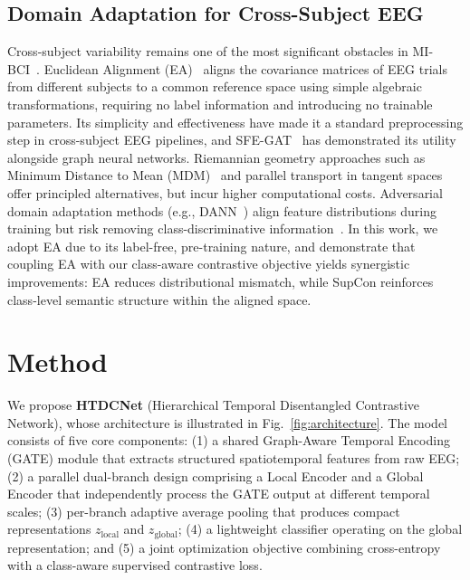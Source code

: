 \documentclass[conference]{IEEEtran}
\begin{document}
\subsection{Domain Adaptation for Cross-Subject EEG}
Cross-subject variability remains one of the most significant obstacles in MI-BCI~\cite{lotte2018review}.
Euclidean Alignment (EA)~\cite{he2019transfer} aligns the covariance matrices of EEG trials from different subjects to a common reference space using simple algebraic transformations, requiring no label information and introducing no trainable parameters.
Its simplicity and effectiveness have made it a standard preprocessing step in cross-subject EEG pipelines, and SFE-GAT~\cite{tang2024sfe} has demonstrated its utility alongside graph neural networks.
Riemannian geometry approaches such as Minimum Distance to Mean (MDM)~\cite{barachant2012multiclass} and parallel transport in tangent spaces offer principled alternatives, but incur higher computational costs.
Adversarial domain adaptation methods (e.g., DANN~\cite{ganin2016domain}) align feature distributions during training but risk removing class-discriminative information~\cite{ozdenizci2020adversarial}.
In this work, we adopt EA due to its label-free, pre-training nature, and demonstrate that coupling EA with our class-aware contrastive objective yields synergistic improvements: EA reduces distributional mismatch, while SupCon reinforces class-level semantic structure within the aligned space.

\section{Method}
\label{sec:method}

We propose \textbf{HTDCNet} (Hierarchical Temporal Disentangled Contrastive Network), whose architecture is illustrated in Fig.~\ref{fig:architecture}.
The model consists of five core components: (1) a shared Graph-Aware Temporal Encoding (GATE) module that extracts structured spatiotemporal features from raw EEG; (2) a parallel dual-branch design comprising a Local Encoder and a Global Encoder that independently process the GATE output at different temporal scales; (3) per-branch adaptive average pooling that produces compact representations $z_{\text{local}}$ and $z_{\text{global}}$; (4) a lightweight classifier operating on the global representation; and (5) a joint optimization objective combining cross-entropy with a class-aware supervised contrastive loss.
\end{document}
